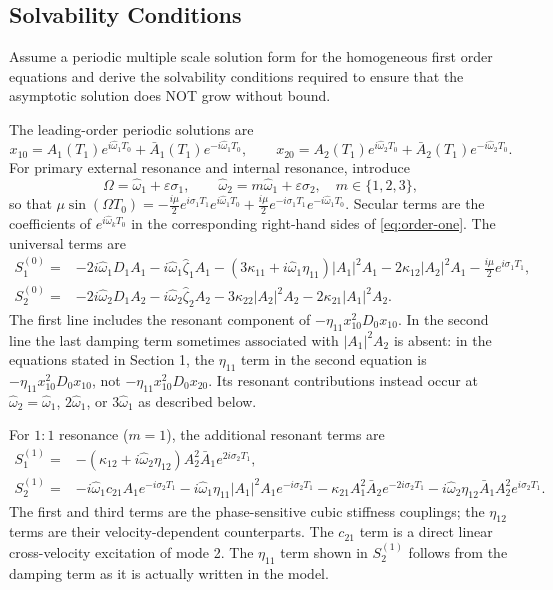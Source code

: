 \documentclass[11pt]{article}
\newenvironment{assignmentinstruction}{\par\begingroup\color{blue}}{\par\endgroup}
\begin{document}
\subsection{Solvability Conditions}
\begin{assignmentinstruction}
Assume a periodic multiple scale solution form for the homogeneous first order equations and derive the solvability conditions required to ensure that the asymptotic solution does NOT grow without bound.
\end{assignmentinstruction}
The leading-order periodic solutions are
\[
x_{10}=A_1(T_1)e^{i\hat\omega_1T_0}+\bar A_1(T_1)e^{-i\hat\omega_1T_0},\qquad
x_{20}=A_2(T_1)e^{i\hat\omega_2T_0}+\bar A_2(T_1)e^{-i\hat\omega_2T_0}.
\]
For primary external resonance and internal resonance, introduce
\[
\Omega=\hat\omega_1+\varepsilon\sigma_1,\qquad
\hat\omega_2=m\hat\omega_1+\varepsilon\sigma_2,\quad m\in\{1,2,3\},
\]
so that $\mu\sin(\Omega T_0)=-\frac{i\mu}{2}e^{i\sigma_1T_1}e^{i\hat\omega_1T_0}+\frac{i\mu}{2}e^{-i\sigma_1T_1}e^{-i\hat\omega_1T_0}$. Secular terms are the coefficients of $e^{i\hat\omega_kT_0}$ in the corresponding right-hand sides of \eqref{eq:order-one}. The universal terms are
\begin{align*}
S_1^{(0)}={}&-2i\hat\omega_1D_1A_1-i\hat\omega_1\hat\zeta_1A_1
-(3\kappa_{11}+i\hat\omega_1\eta_{11})|A_1|^2A_1-2\kappa_{12}|A_2|^2A_1
-\frac{i\mu}{2}e^{i\sigma_1T_1},\\
S_2^{(0)}={}&-2i\hat\omega_2D_1A_2-i\hat\omega_2\hat\zeta_2A_2
-3\kappa_{22}|A_2|^2A_2-2\kappa_{21}|A_1|^2A_2.
\end{align*}
The first line includes the resonant component of $-\eta_{11}x_{10}^2D_0x_{10}$. In the second line the last damping term sometimes associated with $|A_1|^2A_2$ is absent: in the equations stated in Section 1, the $\eta_{11}$ term in the second equation is $-\eta_{11}x_{10}^2D_0x_{10}$, not $-\eta_{11}x_{10}^2D_0x_{20}$. Its resonant contributions instead occur at $\hat\omega_2=\hat\omega_1$, $2\hat\omega_1$, or $3\hat\omega_1$ as described below.

For $1{:}1$ resonance ($m=1$), the additional resonant terms are
\begin{align*}
S_1^{(1)}={}&-(\kappa_{12}+i\hat\omega_2\eta_{12})A_2^2\bar A_1e^{2i\sigma_2T_1},\\
S_2^{(1)}={}&-i\hat\omega_1c_{21}A_1e^{-i\sigma_2T_1}
-i\hat\omega_1\eta_{11}|A_1|^2A_1e^{-i\sigma_2T_1}
-\kappa_{21}A_1^2\bar A_2e^{-2i\sigma_2T_1}
-i\hat\omega_2\eta_{12}\bar A_1A_2^2e^{i\sigma_2T_1}.
\end{align*}
The first and third terms are the phase-sensitive cubic stiffness couplings; the $\eta_{12}$ terms are their velocity-dependent counterparts. The $c_{21}$ term is a direct linear cross-velocity excitation of mode 2. The $\eta_{11}$ term shown in $S_2^{(1)}$ follows from the damping term as it is actually written in the model.
\end{document}

